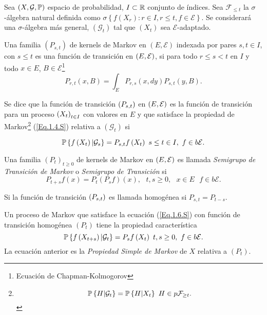 Sea $\left(X,\mathcal{G},\mathbb{P}\right)$ espacio de probabilidad,
$I\subset\mathbb{R}$ conjunto de \'indices. Sea $\mathcal{F}_{\leq t}$
la $\sigma$-\'algebra natural definida como
$\sigma\left\{f\left(X_{r}\right):r\in I, r\leq
t,f\in\mathcal{E}\right\}$. Se considerar\'a una
$\sigma$-\'algebra m\'as general, $ \left(\mathcal{G}_{t}\right)$
tal que $\left(X_{t}\right)$ sea $\mathcal{E}$-adaptado.

\begin{Def}
Una familia $\left(P_{s,t}\right)$ de kernels de Markov en
$\left(E,\mathcal{E}\right)$ indexada por pares $s,t\in I$, con
$s\leq t$ es una funci\'on de transici\'on en $\left(E,\mathcal{E}\right)$, si  para todo
$r\leq s< t$ en $I$ y todo $x\in E$,
$B\in\mathcal{E}$\footnote{Ecuaci\'on de Chapman-Kolmogorov}
\begin{equation}\label{Eq.Kernels}
P_{r,t}\left(x,B\right)=\int_{E}P_{r,s}\left(x,dy\right)P_{s,t}\left(y,B\right).
\end{equation}
\end{Def}

Se dice que la funci\'on de transici\'on $\left(P_{s,t}\right)$ en $\left(E,\mathcal{E}\right)$ es la
funci\'on de transici\'on para un proceso $\left(X_{t}\right)_{t\in I}$  con valores en
$E$ y que satisface la propiedad de
Markov\footnote{\begin{equation}\label{Eq.1.4.S}
\mathbb{P}\left\{H|\mathcal{G}_{t}\right\}=\mathbb{P}\left\{H|X_{t}\right\}\textrm{
}H\in p\mathcal{F}_{\geq t}.
\end{equation}} (\ref{Eq.1.4.S}) relativa a $\left(\mathcal{G}_{t}\right)$ si

\begin{equation}\label{Eq.1.6.S}
\mathbb{P}\left\{f\left(X_{t}\right)|\mathcal{G}_{s}\right\}=P_{s,t}f\left(X_{t}\right)\textrm{
}s\leq t\in I,\textrm{ }f\in b\mathcal{E}.
\end{equation}

\begin{Def}
Una familia $\left(P_{t}\right)_{t\geq0}$ de kernels de Markov en
$\left(E,\mathcal{E}\right)$ es llamada {\em Semigrupo de Transici\'on de Markov} o {\em
Semigrupo de Transici\'on} si
\[P_{t+s}f\left(x\right)=P_{t}\left(P_{s}f\right)\left(x\right),\textrm{ }t,s\geq0,\textrm{ }x\in E\textrm{ }f\in b\mathcal{E}.\]
\end{Def}
\begin{Note}
Si la funci\'on de transici\'on $\left(P_{s,t}\right)$ es llamada homog\'enea si
$P_{s,t}=P_{t-s}$.
\end{Note}

Un proceso de Markov que satisface la ecuaci\'on (\ref{Eq.1.6.S})
con funci\'on de transici\'on homog\'enea $\left(P_{t}\right)$
tiene la propiedad caracter\'istica
\begin{equation}\label{Eq.1.8.S}
\mathbb{P}\left\{f\left(X_{t+s}\right)|\mathcal{G}_{t}\right\}=P_{s}f\left(X_{t}\right)\textrm{
}t,s\geq0,\textrm{ }f\in b\mathcal{E}.
\end{equation}
La ecuaci\'on anterior es la {\em Propiedad Simple de Markov} de
$X$ relativa a $\left(P_{t}\right)$.

